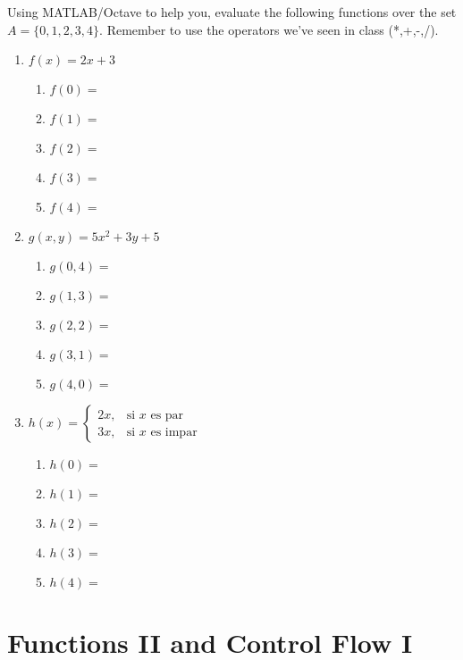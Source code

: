 \documentclass[spanish, 10pt]{article}
\begin{document}
Using MATLAB/Octave to help you, evaluate the following functions over the set $A = \{0,1,2,3,4\}$.
Remember to use the operators we've seen in class (*,+,-,/).
\begin{multicols}{2}
    \begin{enumerate}
        \item $f(x) = 2x + 3$
        \begin{enumerate}
            \item $f(0) =$
            \item $f(1) =$
            \item $f(2) =$
            \item $f(3) =$
            \item $f(4) =$
        \end{enumerate}
        \item $g(x,y) = 5x^2 + 3y + 5$
        \begin{enumerate}
            \item $g(0,4) =$
            \item $g(1,3) =$
            \item $g(2,2) =$
            \item $g(3,1) =$
            \item $g(4,0) =$
        \end{enumerate}
        
        \columnbreak

        \item $h(x) =
            \begin{cases}
                2x, & \text{si } x \text{ es par} \\
                3x, & \text{si } x \text{ es impar}
            \end{cases}$
        \begin{enumerate}
            \item $h(0) =$
            \item $h(1) =$
            \item $h(2) =$
            \item $h(3) =$
            \item $h(4) =$
        \end{enumerate}
    \end{enumerate}
\end{multicols}

\section{Functions II and Control Flow I}
\end{document}
